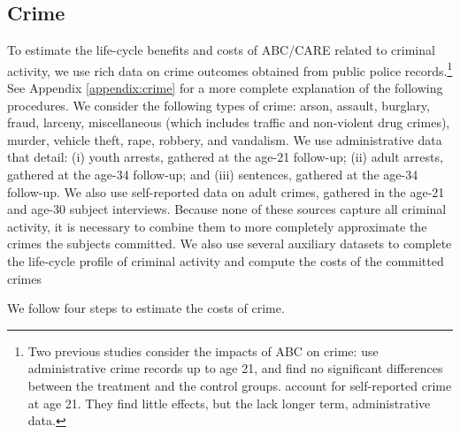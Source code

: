 \subsection{Crime}  \label{sec:crime}

To estimate the life-cycle benefits and costs of ABC/CARE related to criminal activity, we use rich data on crime outcomes obtained from public police records.\footnote{Two previous studies consider the impacts of ABC on crime: \citet{Clarke_Campbell_1998_ABC_Comparison_ECRQ} use administrative crime records up to age 21, and find no significant differences between the treatment and the control groups. \cite{Barnett_Masse_2002_benefitcost,Barnett_Masse_2007_EER} account for self-reported crime at age 21. They find little effects, but the lack longer term, administrative data.} See Appendix \ref{appendix:crime} for a more complete explanation of the following procedures. We consider the following types of crime: arson, assault, burglary, fraud, larceny, miscellaneous (which includes traffic and non-violent drug crimes), murder, vehicle theft, rape, robbery, and vandalism. We use administrative data that detail: (i) youth arrests, gathered at the age-21 follow-up; (ii) adult arrests, gathered at the age-34 follow-up; and (iii) sentences, gathered at the age-34 follow-up. We also use self-reported data on adult crimes, gathered in the age-21 and age-30 subject interviews. Because none of these sources capture all criminal activity, it is necessary to combine them to more completely approximate the crimes the subjects committed. We also use several auxiliary datasets to complete the life-cycle profile of criminal activity and compute the costs of the committed crimes

We follow four steps to estimate the costs of crime.

